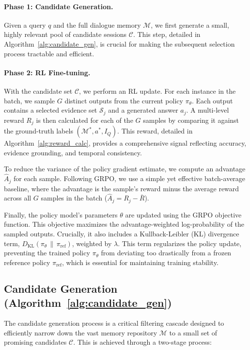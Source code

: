 \documentclass{article} %
\begin{document}
\paragraph{Phase 1: Candidate Generation.}
Given a query $q$ and the full dialogue memory $\mathcal{M}$, we first generate a small, highly relevant pool of candidate sessions $\mathcal{C}$. This step, detailed in Algorithm~\ref{alg:candidate_gen}, is crucial for making the subsequent selection process tractable and efficient.

\paragraph{Phase 2: RL Fine-tuning.}
With the candidate set $\mathcal{C}$, we perform an RL update. For each instance in the batch, we sample $G$ distinct outputs from the current policy $\pi_\theta$. Each output contains a selected evidence set $\mathcal{S}_j$ and a generated answer $a_j$. A multi-level reward $R_j$ is then calculated for each of the $G$ samples by comparing it against the ground-truth labels $(\mathcal{M}^*, a^*, I_Q)$. This reward, detailed in Algorithm~\ref{alg:reward_calc}, provides a comprehensive signal reflecting accuracy, evidence grounding, and temporal consistency.

To reduce the variance of the policy gradient estimate, we compute an advantage $\hat{A}_j$ for each sample. Following GRPO, we use a simple yet effective batch-average baseline, where the advantage is the sample's reward minus the average reward across all $G$ samples in the batch ($\hat{A}_j = R_j - \bar{R}$).

Finally, the policy model's parameters $\theta$ are updated using the GRPO objective function. This objective maximizes the advantage-weighted log-probability of the sampled outputs. Crucially, it also includes a Kullback-Leibler (KL) divergence term, $D_{\text{KL}}(\pi_\theta \,\|\, \pi_{\text{ref}})$, weighted by $\lambda$. This term regularizes the policy update, preventing the trained policy $\pi_\theta$ from deviating too drastically from a frozen reference policy $\pi_{\text{ref}}$, which is essential for maintaining training stability.

\subsection{Candidate Generation (Algorithm~\ref{alg:candidate_gen})}
The candidate generation process is a critical filtering cascade designed to efficiently narrow down the vast memory repository $\mathcal{M}$ to a small set of promising candidates $\mathcal{C}$. This is achieved through a two-stage process:
\end{document}
